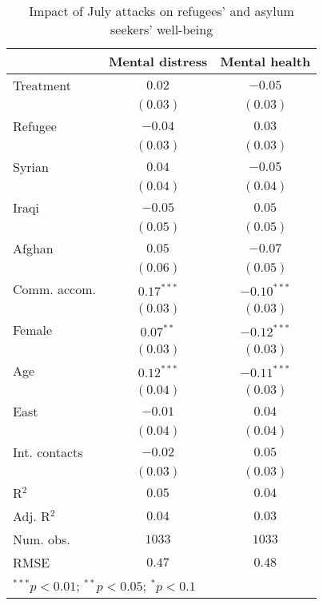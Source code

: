 
\begin{table}
\caption{Impact of July attacks on refugees' and asylum seekers' well-being}
\begin{center}
\begin{tabular}{l c c}
\toprule
 & Mental distress & Mental health \\
\midrule
Treatment     & $0.02$       & $-0.05$       \\
              & $(0.03)$     & $(0.03)$      \\
Refugee       & $-0.04$      & $0.03$        \\
              & $(0.03)$     & $(0.03)$      \\
Syrian        & $0.04$       & $-0.05$       \\
              & $(0.04)$     & $(0.04)$      \\
Iraqi         & $-0.05$      & $0.05$        \\
              & $(0.05)$     & $(0.05)$      \\
Afghan        & $0.05$       & $-0.07$       \\
              & $(0.06)$     & $(0.05)$      \\
Comm. accom.  & $0.17^{***}$ & $-0.10^{***}$ \\
              & $(0.03)$     & $(0.03)$      \\
Female        & $0.07^{**}$  & $-0.12^{***}$ \\
              & $(0.03)$     & $(0.03)$      \\
Age           & $0.12^{***}$ & $-0.11^{***}$ \\
              & $(0.04)$     & $(0.03)$      \\
East          & $-0.01$      & $0.04$        \\
              & $(0.04)$     & $(0.04)$      \\
Int. contacts & $-0.02$      & $0.05$        \\
              & $(0.03)$     & $(0.03)$      \\
\midrule
R$^2$         & $0.05$       & $0.04$        \\
Adj. R$^2$    & $0.04$       & $0.03$        \\
Num. obs.     & $1033$       & $1033$        \\
RMSE          & $0.47$       & $0.48$        \\
\bottomrule
\multicolumn{3}{l}{\scriptsize{$^{***}p<0.01$; $^{**}p<0.05$; $^{*}p<0.1$}}
\end{tabular}
\label{tab_mhealth}
\end{center}
\end{table}

